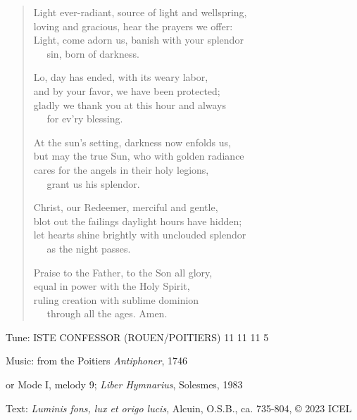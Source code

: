 \hymn

\begin{verse}
Light ever-radiant, source of light and wellspring,\\
loving and gracious, hear the prayers we offer:\\
Light, come adorn us, banish with your splendor\\
   sin, born of darkness.

Lo, day has ended, with its weary labor,\\
and by your favor, we have been protected;\\
gladly we thank you at this hour and always\\
   for ev’ry blessing.

At the sun’s setting, darkness now enfolds us,\\
but may the true Sun, who with golden radiance\\
cares for the angels in their holy legions,\\
   grant us his splendor.

Christ, our Redeemer, merciful and gentle,\\
blot out the failings daylight hours have hidden;\\
let hearts shine brightly with unclouded splendor\\
   as the night passes.

Praise to the Father, to the Son all glory,\\
equal in power with the Holy Spirit,\\
ruling creation with sublime dominion\\
   through all the ages. Amen.
\end{verse}

\begin{hymnsource}
Tune: ISTE CONFESSOR (ROUEN/POITIERS) 11 11 11 5

Music: from the Poitiers \emph{Antiphoner}, 1746

or Mode I, melody 9; \emph{Liber Hymnarius}, Solesmes, 1983

Text: \emph{Luminis fons, lux et origo lucis}, Alcuin, O.S.B., ca. 735-804, © 2023 ICEL
\end{hymnsource}